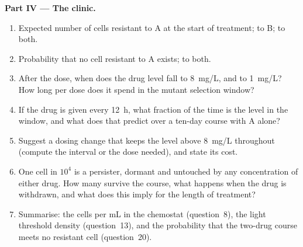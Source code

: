 \begin{problem}
\medskip
\noindent\textbf{Part IV --- The clinic.}
\begin{enumerate}[resume]
  \item Expected number of cells resistant to A at the start of
        treatment; to B; to both.
  \item Probability that no cell resistant to A exists; to both.
  \item After the dose, when does the drug level fall to \qty{8}{mg/L},
        and to \qty{1}{mg/L}? How long per dose does it spend in the
        mutant selection window?
  \item If the drug is given every \qty{12}{h}, what fraction of the
        time is the level in the window, and what does that predict
        over a ten-day course with A alone?
  \item Suggest a dosing change that keeps the level above
        \qty{8}{mg/L} throughout (compute the interval or the dose
        needed), and state its cost.
  \item One cell in $10^{4}$ is a persister, dormant and untouched by
        any concentration of either drug. How many survive the course,
        what happens when the drug is withdrawn, and what does this
        imply for the length of treatment?
  \item Summarise: the cells per mL in the chemostat (question~8), the
        light threshold density (question~13), and the probability that
        the two-drug course meets no resistant cell (question~20).
\end{enumerate}
\end{problem}
